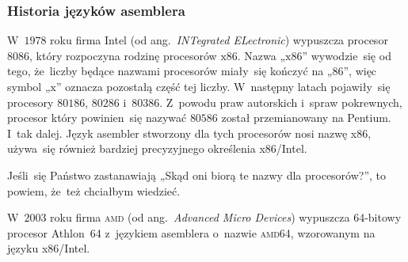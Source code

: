 \documentclass[10pt,t]{beamer}
\begin{document}











\begin{frame}
  \frametitle{Historia języków asemblera}


  W~$1978$ roku firma Intel (od ang.~\textit{INTegrated ELectronic})
  wypuszcza procesor $8086$, który rozpoczyna rodzinę procesorów
  $\text{x}86$. Nazwa „$\text{x}86$” wywodzie~się od tego, że~liczby
  będące nazwami procesorów miały~się kończyć na „$86$”, więc symbol
  „$\text{x}$” oznacza pozostałą część tej liczby. W~następny latach
  pojawiły~się procesory $80186$, $80286$ i~$80386$. Z~powodu praw
  autorskich i~spraw pokrewnych, procesor który powinien~się nazywać
  $80586$ został przemianowany na Pentium. I~tak dalej. Język asembler
  stworzony dla tych procesorów nosi nazwę \alert{x86}, używa~się również
  bardziej precyzyjnego określenia \alert{x86/Intel}.

  Jeśli~się Państwo zastanawiają „Skąd oni biorą te nazwy dla procesorów?”,
  to powiem, że~też chciałbym wiedzieć.

  W~$2003$ roku firma \textsc{amd} (od ang.~\textit{Advanced Micro Devices})
  wypuszcza 64-bitowy procesor Athlon~64 z~językiem asemblera o~nazwie
  \textsc{amd}64, wzorowanym na języku x86/Intel.

\end{frame}
\end{document}
